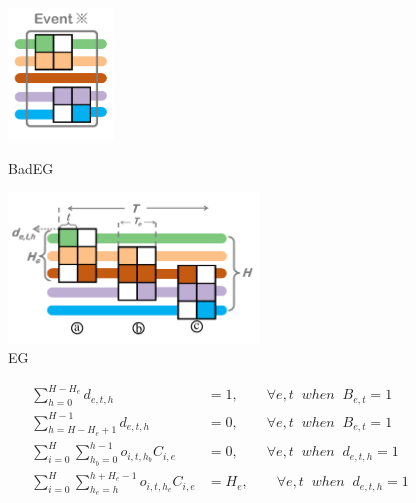 \begin{figure}[t]
	\centering
	\begin{minipage}[c]{0.3\linewidth}
		\vspace{1em}
		\centering
		\centerline{\includegraphics[width=\linewidth,height=3.5cm]{Fig/BadEG.pdf}}
		\vspace{-0.5em}
		\caption{BadEG}
		\label{fig:BadEG}
		\vspace{-1.5em}
	\end{minipage}
	\begin{minipage}[c]{0.69\linewidth}
		\vspace{0em}
		\centering
		\centerline{\includegraphics[width=\linewidth,height=4cm]{Fig/EG.pdf}}
		\vspace{-1em}
		\caption{EG}
		\label{fig:EG}
		\vspace{-1.5em}
	\end{minipage}
\end{figure}

\begin{subequations}
	\begin{align}
	\sum_{h=0}^{H-H_e}d_{e,t,h}&=1, \quad\quad \forall e,t\;\; when\;\; B_{e,t} = 1\\
	\sum_{h=H-H_e+1}^{H-1}d_{e,t,h}&=0, \quad\quad \forall e,t\;\; when\;\; B_{e,t} = 1\\
	\sum_{i=0}^{H}\sum_{h_b=0}^{h-1}o_{i,t,h_b}C_{i,e}&=0, \quad\quad \forall e,t \;\;when\;\; d_{e,t,h}=1 \\
	\sum_{i=0}^{H}\sum_{h_e=h}^{h+H_e-1}o_{i,t,h_e}C_{i,e}&=H_e, \quad\quad \forall e,t \;\;when\;\; d_{e,t,h}=1
	\end{align}
\end{subequations}


